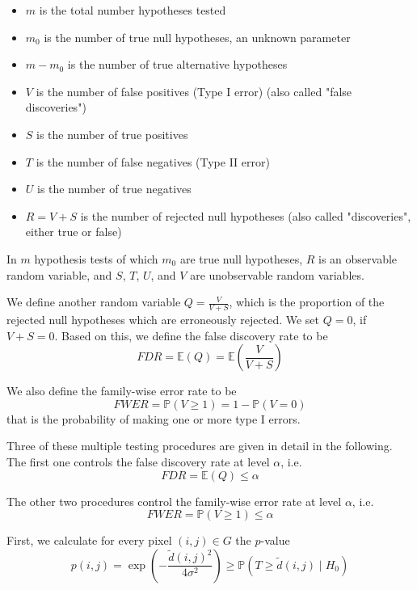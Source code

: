 \documentclass[a4paper,12pt]{article}
\theoremstyle{plain}
\theoremstyle{definition}
\theoremstyle{remark}
\begin{document}
\begin{itemize}
	\item $m$ is the total number hypotheses tested
	\item $m_0$ is the number of true null hypotheses, an unknown parameter
	\item $m - m_0$ is the number of true alternative hypotheses
	\item $V$ is the number of false positives (Type I error) (also called "false discoveries")
	\item $S$ is the number of true positives
	\item $T$ is the number of false negatives (Type II error)
	\item $U$ is the number of true negatives
	\item $R = V + S$ is the number of rejected null hypotheses (also called "discoveries", either true or false)
\end{itemize}
In $m$ hypothesis tests of which $m_0$ are true null hypotheses, $R$ is an observable random variable, and $S$, $T$, $U$, and $V$ are unobservable random variables.

We define another random variable $Q = \frac{V}{V + S}$, which is the proportion of the rejected null hypotheses which are erroneously rejected. We set $Q = 0$, if $V + S = 0$. Based on this, we define the false discovery rate to be
\begin{equation}
	FDR = \mathbb{E}(Q) = \mathbb{E} \left( \frac{V}{V + S} \right)
\end{equation}

We also define the family-wise error rate to be
\begin{equation}
	FWER = \mathbb{P}( V \geq 1 ) = 1 - \mathbb{P}( V = 0 )
\end{equation}
that is the probability of making one or more type I errors.

Three of these multiple testing procedures are given in detail in the following. The first one controls the false discovery rate at level $\alpha$, i.e.
\begin{equation}
	FDR = \mathbb{E}(Q) \leq \alpha
\end{equation}

The other two procedures control the family-wise error rate at level $\alpha$, i.e.
\begin{equation}
	FWER = \mathbb{P}( V \geq 1 ) \leq \alpha
\end{equation}

First, we calculate for every pixel $(i, j) \in G$ the $p$-value
\begin{equation}
	p(i, j) = \exp \left( - \frac{\tilde{d}(i, j)^2}{4 \sigma^2} \right) \geq \mathbb{P}(T \geq \tilde{d}(i, j) \mid H_0)
\end{equation}
\end{document}
